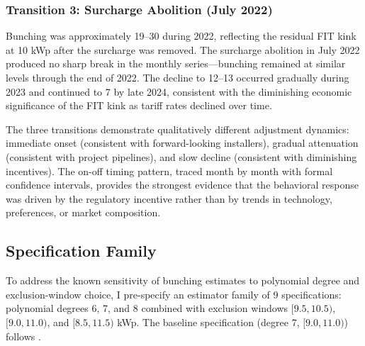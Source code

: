 \documentclass[12pt]{article}
\begin{document}
\subsubsection*{Transition 3: Surcharge Abolition (July 2022)} Bunching was approximately 19--30 during 2022, reflecting the residual FIT kink at 10 kWp after the surcharge was removed. The surcharge abolition in July 2022 produced no sharp break in the monthly series---bunching remained at similar levels through the end of 2022. The decline to 12--13 occurred gradually during 2023 and continued to 7 by late 2024, consistent with the diminishing economic significance of the FIT kink as tariff rates declined over time.

The three transitions demonstrate qualitatively different adjustment dynamics: immediate onset (consistent with forward-looking installers), gradual attenuation (consistent with project pipelines), and slow decline (consistent with diminishing incentives). The on-off timing pattern, traced month by month with formal confidence intervals, provides the strongest evidence that the behavioral response was driven by the regulatory incentive rather than by trends in technology, preferences, or market composition.

\subsection{Specification Family}

To address the known sensitivity of bunching estimates to polynomial degree and exclusion-window choice, I pre-specify an estimator family of 9 specifications: polynomial degrees 6, 7, and 8 combined with exclusion windows $[9.5, 10.5)$, $[9.0, 11.0)$, and $[8.5, 11.5)$ kWp. The baseline specification (degree 7, $[9.0, 11.0)$) follows \citet{kleven2013using}.
\end{document}
